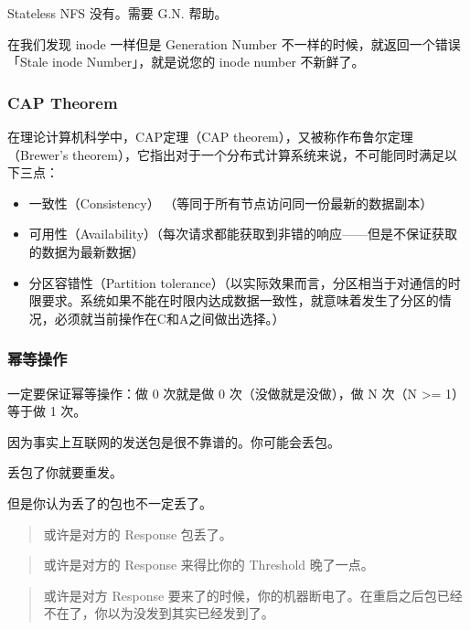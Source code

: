 \documentclass[
]{article}
\begin{document}
Stateless NFS 没有。需要 G.N. 帮助。

在我们发现 inode 一样但是 Generation Number
不一样的时候，就返回一个错误「Stale inode Number」，就是说您的 inode
number 不新鲜了。

\hypertarget{header-n58}{%
\subsubsection{CAP Theorem}\label{header-n58}}

在理论计算机科学中，CAP定理（CAP theorem），又被称作布鲁尔定理（Brewer's
theorem），它指出对于一个分布式计算系统来说，不可能同时满足以下三点：

\begin{itemize}
\item
  一致性（Consistency） （等同于所有节点访问同一份最新的数据副本）
\item
  可用性（Availability）（每次请求都能获取到非错的响应------但是不保证获取的数据为最新数据）
\item
  分区容错性（Partition
  tolerance）（以实际效果而言，分区相当于对通信的时限要求。系统如果不能在时限内达成数据一致性，就意味着发生了分区的情况，必须就当前操作在C和A之间做出选择。）
\end{itemize}

\hypertarget{header-n67}{%
\subsubsection{幂等操作}\label{header-n67}}

一定要保证幂等操作：做 0 次就是做 0 次（没做就是没做），做 N 次（N
\textgreater= 1）等于做 1 次。

因为事实上互联网的发送包是很不靠谱的。你可能会丢包。

丢包了你就要重发。

但是你认为丢了的包也不一定丢了。

\begin{quote}
或许是对方的 Response 包丢了。
\end{quote}

\begin{quote}
或许是对方的 Response 来得比你的 Threshold 晚了一点。
\end{quote}

\begin{quote}
或许是对方 Response
要来了的时候，你的机器断电了。在重启之后包已经不在了，你以为没发到其实已经发到了。
\end{quote}
\end{document}
